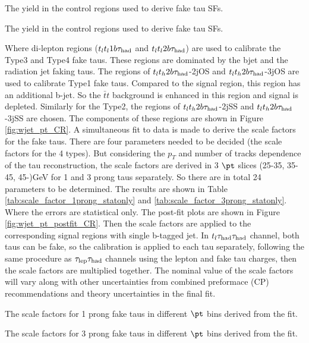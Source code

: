\begin{table}
\caption{The yield in the control regions used to derive fake tau SFs.}
\label{tab:SFCR_yield}

\end{table}
\begin{table}
\caption{The yield in the control regions used to derive fake tau SFs.}
\label{tab:SFCR_yield_1}

\end{table}

Where di-lepton regions ($t_lt_l1b\tau_\text{had}$ and $t_lt_l2b\tau_\text{had}$) are used to calibrate the Type3 and Type4 fake taus. These regions are dominated by the bjet and the radiation jet faking taus. The regions of
$t_lt_h2b\tau_\text{had}$-2jOS and $t_lt_h2b\tau_\text{had}$-3jOS are used to calibrate Type1 fake taus. Compared to the signal region, this region has an additional b-jet. So the $\bar{t}t$ background is enhanced in this region and signal is depleted. Similarly for the Type2, the regions of $t_lt_h2b\tau_\text{had}$-2jSS and $t_lt_h2b\tau_\text{had}$-3jSS are chosen. The components of these regions are shown in Figure \ref{fig:wjet_pt_CR}. A simultaneous fit to data is made to derive the scale factors for the fake taus. There are four parameters needed to be decided (the scale factors for the 4 types). But considering the $p_{T}$ and number of tracks dependence of the tau reconstruction, the scale factors are derived in 3 $\pt$ slices (25-35, 35-45, 45-)GeV for 1 and 3 prong taus separately. So there are in total 24 parameters to be determined. The results are shown in Table \ref{tab:scale_factor_1prong_statonly} and \ref{tab:scale_factor_3prong_statonly}. Where the errors are statistical only. The post-fit plots are shown in Figure \ref{fig:wjet_pt_postfit_CR}. Then the scale factors are applied to the corresponding signal regions with single b-tagged jet. In $t_l\tau_\text{had}{}\tau_\text{had}$ channel, both taus can be fake, so the calibration is applied to each tau separately, following the same procedure as $\tau_\text{lep}{}\tau_\text{had}$ channels using the lepton and fake tau charges, then the scale factors are multiplied together. The nominal value of the scale factors will vary along with other uncertainties from combined preformace (CP) recommendations and theory uncertainties in the final fit.




\begin{table}
\caption{The scale factors for 1 prong fake taus in different $\pt$ bins derived from the fit.}
\label{tab:scale_factor_1prong_statonly}

\end{table}
\begin{table}
\caption{The scale factors for 3 prong fake taus in different $\pt$ bins derived from the fit.}
\label{tab:scale_factor_3prong_statonly}

\end{table}


